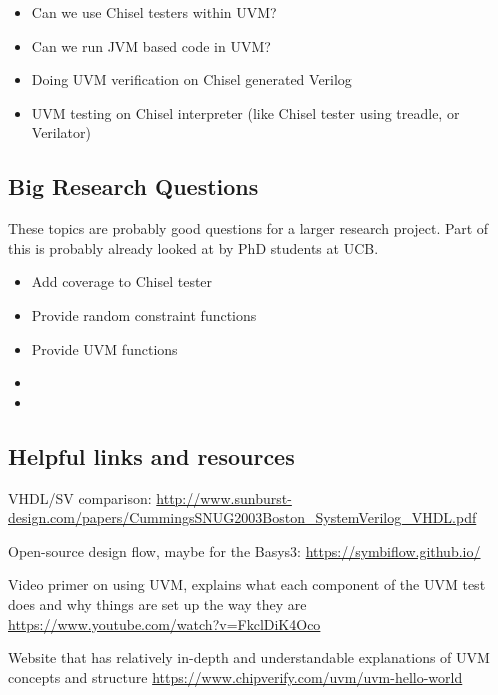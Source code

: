 \documentclass[a4paper, conference]{IEEEtran}
\begin{document}
\begin{itemize}
\item Can we use Chisel testers within UVM?
\item Can we run JVM based code in UVM?
\item Doing UVM verification on Chisel generated Verilog
\item UVM testing on Chisel interpreter (like Chisel tester using treadle, or Verilator)
\end{itemize}

\subsection{Big Research Questions}

These topics are probably good questions for a larger research project.
Part of this is probably already looked at by PhD students at UCB.

\begin{itemize}
\item Add coverage to Chisel tester
\item Provide random constraint functions
\item Provide UVM functions
\item 
\item 
\end{itemize}

\subsection{Helpful links and resources}

VHDL/SV comparison: \url{http://www.sunburst-design.com/papers/CummingsSNUG2003Boston_SystemVerilog_VHDL.pdf}

Open-source design flow, maybe for the Basys3: \url{https://symbiflow.github.io/}

Video primer on using UVM, explains what each component of the UVM test does and why things are set up the way they are
\url{https://www.youtube.com/watch?v=FkclDiK4Oco}

Website that has relatively in-depth and understandable explanations of UVM concepts and structure
\url{https://www.chipverify.com/uvm/uvm-hello-world}







\end{document}
